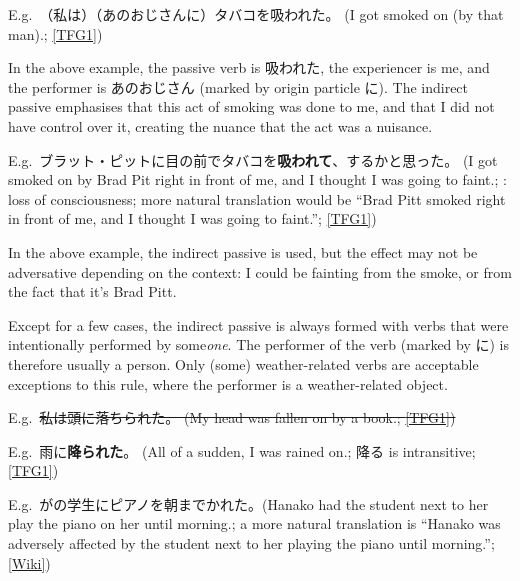 \documentclass[../nihongo-gakushuu-kyouzai.tex]{subfiles}
\begin{document}
\begin{itemize}
    E.g.\ （私は）（あのおじさんに）タバコを吸われた。 (I got smoked on (by that man).; \href{https://www.tofugu.com/japanese-grammar/verb-passive-form-rareru\#direct-vs-indirect-passive}{[TFG1]})

    In the above example, the passive verb is 吸われた, the experiencer is me, and the performer is あのおじさん (marked by origin particle に). The indirect passive emphasises that this act of smoking was done to me, and that I did not have control over it, creating the nuance that the act was a nuisance.

    E.g.\ ブラット・ピットに目の前でタバコを\textbf{吸われて}、するかと思った。 (I got smoked on by Brad Pit right in front of me, and I thought I was going to faint.; : loss of consciousness; more natural translation would be ``Brad Pitt smoked right in front of me, and I thought I was going to faint.''; \href{https://www.tofugu.com/japanese-grammar/verb-passive-form-rareru\#direct-vs-indirect-passive}{[TFG1]})

    In the above example, the indirect passive is used, but the effect may not be adversative depending on the context: I could be fainting from the smoke, or from the fact that it's Brad Pitt.

    Except for a few cases, the indirect passive is always formed with verbs that were intentionally performed by some\emph{one}. The performer of the verb (marked by に) is therefore usually a person. Only (some) weather-related verbs are acceptable exceptions to this rule, where the performer is a weather-related object.

    E.g.\ \st{私は頭に落ちられた。 (My head was fallen on by a book.; \href{https://www.tofugu.com/japanese-grammar/verb-passive-form-rareru\#direct-vs-indirect-passive}{[TFG1]}) }

    E.g.\ 雨に\textbf{降られた}。 (All of a sudden, I was rained on.; 降る is intransitive; \href{https://www.tofugu.com/japanese-grammar/verb-passive-form-rareru\#direct-vs-indirect-passive}{[TFG1]})

    E.g.\ がの学生にピアノを朝までかれた。(Hanako had the student next to her play the piano on her until morning.; a more natural translation is ``Hanako was adversely affected by the student next to her playing the piano until morning.''; \href{https://en.wikipedia.org/wiki/Passive\_voice\#Adversative\_passive}{[Wiki]})
\end{itemize}
\end{document}

